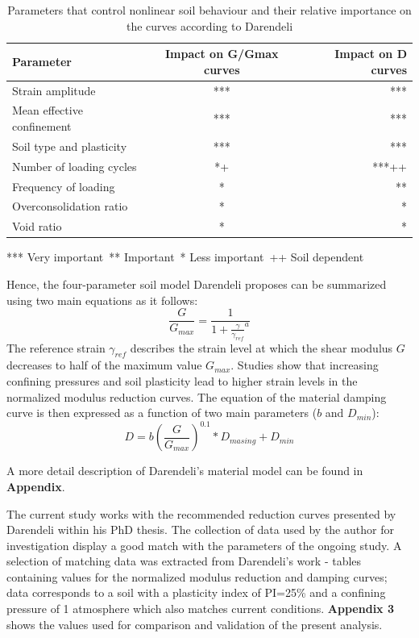\documentclass[10pt,a4paper]{report}
\begin{document}
\begin{table}[h!]
\centering
\begin{tabular}{|l|c|r|}
	\hline Parameter       &      Impact on G/Gmax curves   &  Impact on D curves     \\ 
	\hline Strain amplitude    & *** &  ***  \\ 
	\hline Mean effective confinement  & ***  &  ***  \\ 
	\hline Soil type and plasticity &  ***  &  ***    \\ 
	\hline Number of loading cycles &  *+  &  ***++    \\ 
	\hline Frequency of loading &  *  &    **    \\ 
	\hline Overconsolidation ratio &  *  &    *    \\ 
	\hline Void ratio  &   *   &    *    \\ 
	\hline
\end{tabular}

*** Very important\
** Important\
* Less important\
++ Soil dependent\
\caption{Parameters that control nonlinear soil behaviour and their relative importance on the curves according to Darendeli}
\label{Darendeli_param}
\end{table}

Hence, the four-parameter soil model Darendeli proposes can be summarized using two main equations as it follows:
\begin{equation}
	\frac{G}{G_{max}}=\frac{1}{1+{\frac{\gamma}{\gamma_{ref}}}^a}
\end{equation}
The reference strain $\gamma_{ref}$ describes the strain level at which the shear modulus $G$ decreases to half of the maximum value $G_{max}$. Studies show that increasing confining pressures and soil plasticity lead to higher strain levels in the normalized modulus reduction curves.
The equation of the material damping curve is then expressed as a function of two main parameters ($b$ and $D_{min}$):
\begin{equation}
	D=b(\frac{G}{G_{max}})^{0.1}*D_{masing}+D_{min}
\end{equation}

A more detail description of Darendeli's material model can be found in \textbf{Appendix}.


The current study works with the recommended reduction curves presented by Darendeli within his PhD thesis. The collection of data used by the author for investigation display a good match with the parameters of the ongoing study. A selection of matching data was extracted from Darendeli's work - tables containing values for the normalized modulus reduction and damping curves; data corresponds to a soil with a plasticity index of PI=25\% and a confining pressure of 1 atmosphere which also matches current conditions. \textbf{Appendix 3} shows the values used for comparison and validation of the present analysis.
\end{document}

